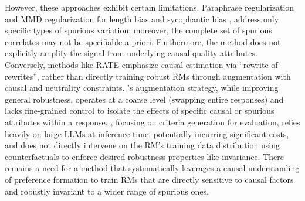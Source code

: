 However, these approaches exhibit certain limitations. Paraphrase regularization \citep{wu2025rewordbench} and MMD regularization for length bias and sycophantic bias \citep{wang2025beyond}, address only specific types of spurious variation; moreover, the complete set of spurious correlates may not be specifiable a priori. Furthermore, the method does not explicitly amplify the signal from underlying causal quality attributes.
Conversely, methods like RATE \citep{reber2024rate} emphasize causal estimation via ``rewrite of rewrites'', rather than directly training robust RMs through augmentation with causal and neutrality constraints.
\rrm's augmentation strategy, while improving general robustness, operates at a coarse level (swapping entire responses) and lacks fine-grained control to isolate the effects of specific causal or spurious attributes within a response. \carmo, focusing on criteria generation for evaluation, relies heavily on large LLMs at inference time, potentially incurring significant costs, and does not directly intervene on the RM's training data distribution using counterfactuals to enforce desired robustness properties like invariance. There remains a need for a method that systematically leverages a causal understanding of preference formation to train RMs that are directly sensitive to causal factors and robustly invariant to a wider range of spurious ones.


